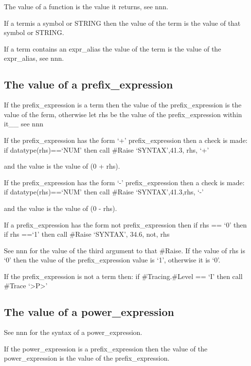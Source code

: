 The value of a function is the value it returns, see nnn.

If a termis a symbol or STRING then the value of the term is the value
of that symbol or STRING.

If a term contains an expr\_alias the value of the term is the value of
the expr\_alias, see nnn.

\hypertarget{the-value-of-a-prefix_expression}{%
\subsection{The value of a
prefix\_expression}\label{the-value-of-a-prefix_expression}}

If the prefix\_expression is a term then the value of the
prefix\_expression is the value of the ferm, otherwise let rhs be the
value of the prefix\_expression within it\_\_ see nnn

If the prefix\_expression has the form `+' prefix\_expression then a
check is made: if datatype(rhs)==`NUM' then call \#Raise `SYNTAX',41.3,
rhs, `+'

and the value is the value of (0 + rhs).

If the prefix\_expression has the form `-' prefix\_expression then a
check is made: if datatype(rhs)==`NUM' then call \#Raise
`SYNTAX',41.3,rhs, `-'

and the value is the value of (0 - rhs).

If a prefix\_expression has the form not prefix\_expression then if rhs
== `0' then if rhs ==`1' then call \#Raise `SYNTAX', 34.6, not, rhs

See nnn for the value of the third argument to that \#Raise. If the
value of rhs is `0' then the value of the prefix\_expression value is
`1', otherwise it is `0'.

If the prefix\_expression is not a term then: if \#Tracing.\#Level ==
`I' then call \#Trace `\textgreater P\textgreater{}'

\hypertarget{the-value-of-a-power_expression}{%
\subsection{The value of a
power\_expression}\label{the-value-of-a-power_expression}}

See nnn for the syntax of a power\_expression.

If the power\_expression is a prefix\_expression then the value of the
power\_expression is the value of the prefix\_expression.

